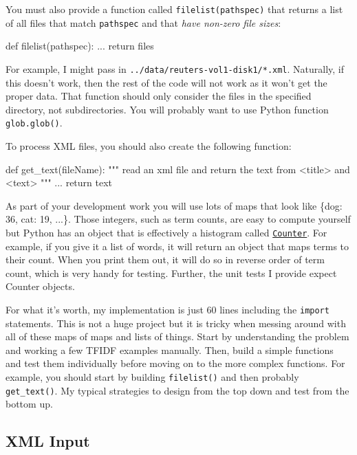 \begin{fullwidth}
You must also provide a function called {\tt filelist(pathspec)} that returns a list of all files that match {\tt pathspec} and that {\em  have non-zero file sizes}:

\begin{pyverbatim}
def filelist(pathspec):
    ...
    return files
\end{pyverbatim}
	
For example, I might pass in {\tt\small ../data/reuters-vol1-disk1/*.xml}. Naturally, if this doesn't work, then the rest of the code will not work as it won't get the proper data.  That function should only consider the files in the specified directory, not subdirectories.  You will probably want to use Python function {\tt glob.glob()}.

To process XML files, you should also create the following function:

\begin{pyverbatim}
def get_text(fileName):
    """
    read an xml file and return the text from <title> and <text>
    """
    ...
    return text
\end{pyverbatim}

As part of your development work you will use lots of maps that look like \{dog: 36, cat: 19, ...\}.   Those integers, such as term counts, are easy to compute yourself but Python has an object that is effectively a histogram called \href{https://docs.python.org/2/library/collections.html#collections.Counter}{{\tt Counter}}. For example, if you give it a list of words, it will return an object that maps terms to their count. When you print them out, it will do so in reverse order of term count, which is very handy for testing.  Further, the unit tests I provide expect Counter objects.

For what it's worth, my implementation is just 60 lines including the {\tt import} statements. This is not a huge project but it is tricky when messing around with all of these maps of maps and lists of things. Start by understanding the problem and working a few TFIDF examples manually. Then, build a simple functions and test them individually before moving on to the more complex functions. For example, you should start by building {\tt filelist()} and then probably {\tt get\_text()}. My typical strategies to design from the top down and test from the bottom up.

\subsection{XML Input}


\end{fullwidth}
